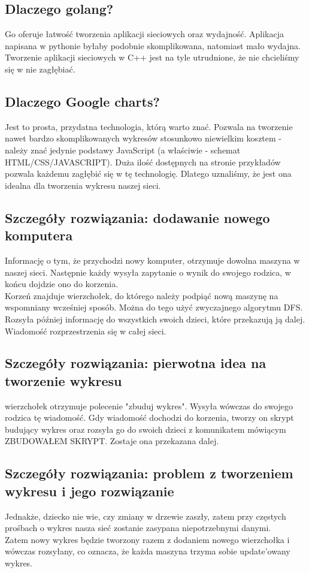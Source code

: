 \subsection{Dlaczego golang?}
Go oferuje łatwość tworzenia aplikacji sieciowych oraz wydajność. Aplikacja napisana w pythonie byłaby podobnie skomplikowana, natomiast mało wydajna. Tworzenie aplikacji sieciowych w C++ jest na tyle utrudnione, że nie chcieliśmy się w nie zagłębiać.

\subsection{Dlaczego Google charts?}
Jest to prosta, przydatna technologia, którą warto znać. Pozwala na tworzenie nawet bardzo skomplikowanych wykresów stosunkowo niewielkim kosztem - należy znać jedynie podstawy JavaScript (a właściwie - schemat HTML/CSS/JAVASCRIPT). Duża ilość dostępnych na stronie przykładów pozwala każdemu zagłębić się w tę technologię. Dlatego uznaliśmy, że jest ona idealna dla tworzenia wykresu naszej sieci.

\subsection{Szczegóły rozwiązania: dodawanie nowego komputera}
Informację o tym, że przychodzi nowy komputer, otrzymuje dowolna maszyna w naszej sieci. Następnie każdy wysyła zapytanie o wynik do swojego rodzica, w końcu dojdzie ono do korzenia.\\
\indent Korzeń znajduje wierzchołek, do którego należy podpiąć nową maszynę na wspomniany wcześniej sposób. Można do tego użyć zwyczajnego algorytmu DFS.\\
\indent Rozsyła później informację do wszystkich swoich dzieci, które przekazują ją dalej. Wiadomość rozprzestrzenia się w całej sieci.


\subsection{Szczegóły rozwiązania: pierwotna idea na tworzenie wykresu}
wierzchołek otrzymuje polecenie "zbuduj wykres". Wysyła wówczas do swojego rodzica tę wiadomość. Gdy wiadomość dochodzi do korzenia, tworzy on skrypt budujący wykres oraz rozsyła go do swoich dzieci z komunikatem mówiącym ZBUDOWAŁEM SKRYPT. Zostaje ona przekazana dalej.\\

\subsection{Szczegóły rozwiązania: problem z tworzeniem wykresu i jego rozwiązanie}
Jednakże, dziecko nie wie, czy zmiany w drzewie zaszły, zatem przy częstych prośbach o wykres nasza sieć zostanie zasypana niepotrzebnymi danymi.\\
\indent Zatem nowy wykres będzie tworzony razem z dodaniem nowego wierzchołka i wówczas rozsyłany, co oznacza, że każda maszyna trzyma sobie update'owany wykres.

